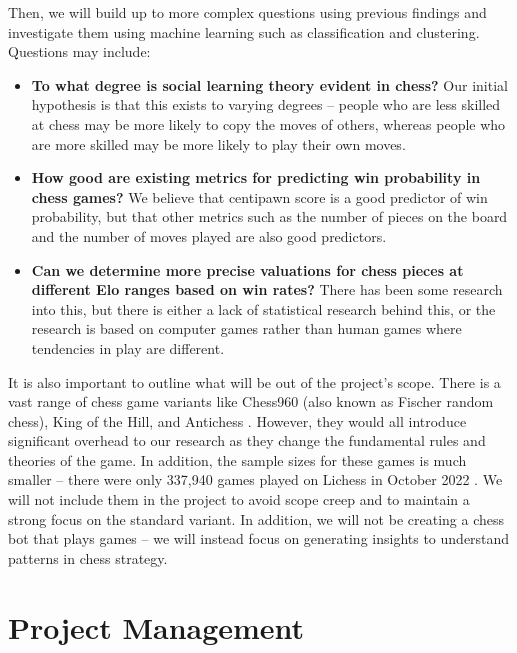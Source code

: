 \documentclass[%
 superscriptaddress,
showpacs,preprintnumbers,
 amsmath,
 amssymb,
 aps,
 pra,
showkeys,
onecolumn,
notitlepage,
11pt,
tightenlines      %
]{revtex4-1}
\begin{document}
Then, we will build up to more complex questions using previous findings and investigate them using machine learning such as classification and clustering. Questions may include:

\begin{itemize}
    \setlength\itemsep{-0.5em}
    \item \textbf{To what degree is social learning theory evident in chess?} Our initial hypothesis is that this exists to varying degrees -- people who are less skilled at chess may be more likely to copy the moves of others, whereas people who are more skilled may be more likely to play their own moves.
    \item \textbf{How good are existing metrics for predicting win probability in chess games?} We believe that centipawn score is a good predictor of win probability, but that other metrics such as the number of pieces on the board and the number of moves played are also good predictors.
    \item \textbf{Can we determine more precise valuations for chess pieces at different Elo ranges based on win rates?} There has been some research into this, but there is either a lack of statistical research behind this, or the research is based on computer games rather than human games where tendencies in play are different.
\end{itemize}

It is also important to outline what will be out of the project's scope. There is a vast range of chess game variants like Chess960 (also known as Fischer random chess), King of the Hill, and Antichess \cite{lichessBlitzRatingDistribution}. However, they would all introduce significant overhead to our research as they change the fundamental rules and theories of the game. In addition, the sample sizes for these games is much smaller -- there were only 337,940 games played on Lichess in October 2022 \cite{lichessOpenDatabase}. We will not include them in the project to avoid scope creep and to maintain a strong focus on the standard variant. In addition, we will not be creating a chess bot that plays games -- we will instead focus on generating insights to understand patterns in chess strategy.

\section{Project Management}

\end{document}
